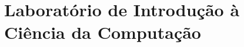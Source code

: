 \chapter[Laboratório de Introdução à Ciencia da Computação] {Laboratório de 
Introdução à Ciência da Computação} \label{ch:lab_icc_I}
